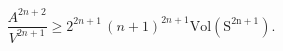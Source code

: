 \begin{equation}
\frac{A^{2n+2}}{V^{2n+1}}\ge 2^{2n+1}\,(n+1)^{2n+1}\mathrm{Vol(S^{2n+1})}.\label{Minkh}
\end{equation}


